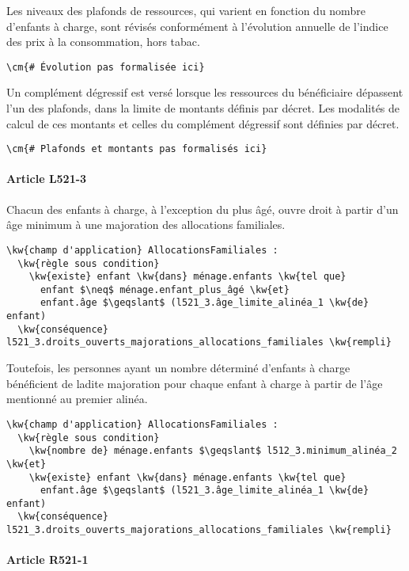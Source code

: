 \documentclass[12pt, french]{article}
\newcommand{\cm}[1]{\textbf{\textcolor{Gray}{#1}}}
\newcommand{\kw}[1]{\textbf{\textcolor{OliveGreen}{#1}}}
\begin{document}
Les niveaux des plafonds de ressources, qui varient en fonction du nombre d'enfants à charge, sont révisés conformément à l'évolution annuelle de l'indice des prix à la consommation, hors tabac.

\begin{Verbatim}
\cm{# Évolution pas formalisée ici}
\end{Verbatim}

Un complément dégressif est versé lorsque les ressources du bénéficiaire dépassent l'un des plafonds, dans la limite de montants définis par décret. Les modalités de calcul de ces montants et celles du complément dégressif sont définies par décret.

\begin{Verbatim}
\cm{# Plafonds et montants pas formalisés ici}
\end{Verbatim}

\paragraph{Article L521-3}

Chacun des enfants à charge, à l'exception du plus âgé, ouvre droit à partir d'un âge minimum à une majoration des allocations familiales.

\begin{Verbatim}
\kw{champ d'application} AllocationsFamiliales :
  \kw{règle sous condition}
    \kw{existe} enfant \kw{dans} ménage.enfants \kw{tel que}
      enfant $\neq$ ménage.enfant_plus_âgé \kw{et}
      enfant.âge $\geqslant$ (l521_3.âge_limite_alinéa_1 \kw{de} enfant)
  \kw{conséquence} l521_3.droits_ouverts_majorations_allocations_familiales \kw{rempli}
\end{Verbatim}


Toutefois, les personnes ayant un nombre déterminé d'enfants à charge bénéficient de ladite majoration pour chaque enfant à charge à partir de l'âge mentionné au premier alinéa.

\begin{Verbatim}
\kw{champ d'application} AllocationsFamiliales :
  \kw{règle sous condition}
    \kw{nombre de} ménage.enfants $\geqslant$ l512_3.minimum_alinéa_2 \kw{et}
    \kw{existe} enfant \kw{dans} ménage.enfants \kw{tel que}
      enfant.âge $\geqslant$ (l521_3.âge_limite_alinéa_1 \kw{de} enfant)
  \kw{conséquence} l521_3.droits_ouverts_majorations_allocations_familiales \kw{rempli}
\end{Verbatim}

\paragraph{Article R521-1}
\end{document}
